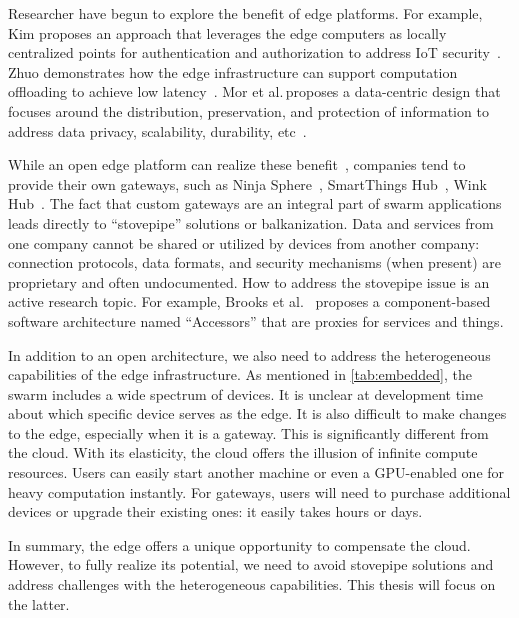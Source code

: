 Researcher have begun to explore the benefit of edge platforms. For example, Kim
proposes an approach that leverages the edge computers as locally centralized
points for authentication and authorization to address IoT
security~\cite{kim2017securing}. Zhuo demonstrates how the edge infrastructure
can support computation offloading to achieve low
latency~\cite{chen2018application}. Mor et al.\,proposes a data-centric design
that focuses around the distribution, preservation, and protection of
information to address data privacy, scalability, durability,
etc~\cite{mor2016toward}.

While an open edge platform can realize these
benefit~\cite{zachariah1001internet}, companies tend to provide their own
gateways, such as Ninja Sphere~\cite{ninja}, SmartThings Hub~\cite{smartthings},
Wink Hub~\cite{wink}. The fact that custom gateways are an integral part of
swarm applications leads directly to ``stovepipe'' solutions or
balkanization. Data and services from one company cannot be shared or utilized
by devices from another company: connection protocols, data formats, and
security mechanisms (when present) are proprietary and often undocumented. How
to address the stovepipe issue is an active research topic. For example, Brooks
et al.~\cite{brooks2018component} proposes a component-based software
architecture named ``Accessors'' that are proxies for services and things.

In addition to an open architecture, we also need to address the heterogeneous
capabilities of the edge infrastructure. As mentioned in \autoref{tab:embedded},
the swarm includes a wide spectrum of devices. It is unclear at development time
about which specific device serves as the edge. It is also difficult to make
changes to the edge, especially when it is a gateway. This is significantly
different from the cloud. With its elasticity, the cloud offers the illusion of
infinite compute resources. Users can easily start another machine or even a
GPU-enabled one for heavy computation instantly. For gateways, users will need
to purchase additional devices or upgrade their existing ones: it easily takes
hours or days.

In summary, the edge offers a unique opportunity to compensate the
cloud. However, to fully realize its potential, we need to avoid stovepipe
solutions and address challenges with the heterogeneous capabilities. This
thesis will focus on the latter.

